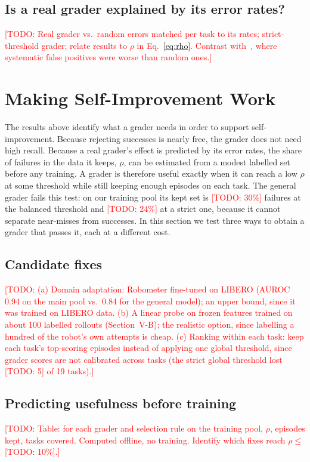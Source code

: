 \documentclass[letterpaper, journal, twoside]{IEEEtran}
\newcommand{\todo}[1]{\textcolor{red}{[TODO: #1]}}
\begin{document}
\subsection{Is a real grader explained by its error rates?}
\todo{Real grader vs.\ random errors matched per task to its rates; strict-threshold grader; relate results to
$\rho$ in Eq.~\eqref{eq:rho}. Contrast with~\cite{egashira2026delay}, where systematic false positives were worse than
random ones.}

\section{Making Self-Improvement Work}
\label{sec:fixes}

The results above identify what a grader needs in order to support self-improvement. Because rejecting successes is
nearly free, the grader does not need high recall. Because a real grader's effect is predicted by its error rates, the
share of failures in the data it keeps, $\rho$, can be estimated from a modest labelled set before any training. A grader
is therefore useful exactly when it can reach a low $\rho$ at some threshold while still keeping enough episodes on each
task. The general grader fails this test: on our training pool its kept set is \todo{30\%} failures at the balanced
threshold and \todo{24\%} at a strict one, because it cannot separate near-misses from successes. In this section we
test three ways to obtain a grader that passes it, each at a different cost.

\subsection{Candidate fixes}
\todo{(a) Domain adaptation: Robometer fine-tuned on LIBERO (AUROC 0.94 on the main pool vs.\ 0.84 for the general
model); an upper bound, since it was trained on LIBERO data. (b) A linear probe on frozen features trained on about 100
labelled rollouts (Section~V-B); the realistic option, since labelling a hundred of the robot's own attempts is cheap.
(c) Ranking within each task: keep each task's top-scoring episodes instead of applying one global threshold, since
grader scores are not calibrated across tasks (the strict global threshold lost \todo{5} of 19 tasks).}

\subsection{Predicting usefulness before training}
\todo{Table: for each grader and selection rule on the training pool, $\rho$, episodes kept, tasks covered. Computed
offline, no training. Identify which fixes reach $\rho \le$ \todo{10\%}.}
\end{document}
